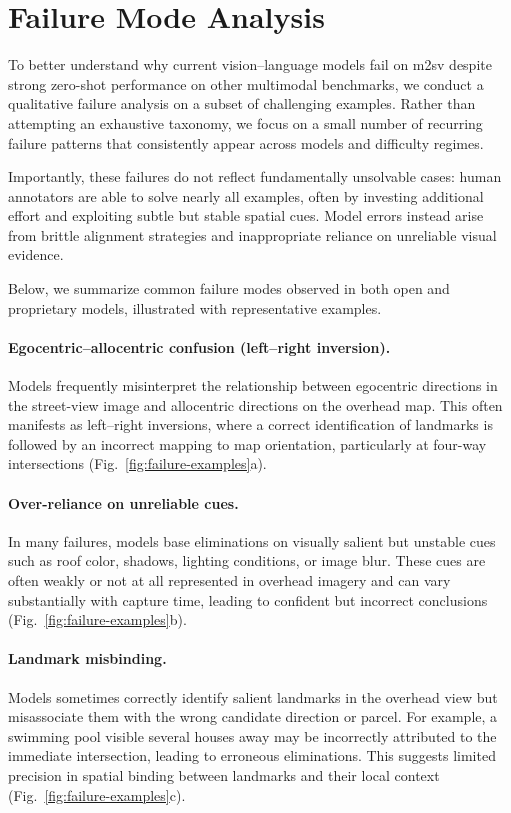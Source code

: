 \documentclass{article}
\begin{document}
\section{Failure Mode Analysis}
\label{sec:failure-analysis}

To better understand why current vision--language models fail on m2sv despite
strong zero-shot performance on other multimodal benchmarks, we conduct a
qualitative failure analysis on a subset of challenging examples. Rather than
attempting an exhaustive taxonomy, we focus on a small number of recurring
failure patterns that consistently appear across models and difficulty regimes.

Importantly, these failures do not reflect fundamentally unsolvable cases: human
annotators are able to solve nearly all examples, often by investing additional
effort and exploiting subtle but stable spatial cues. Model errors instead arise
from brittle alignment strategies and inappropriate reliance on unreliable visual
evidence.

Below, we summarize common failure modes observed in both open and
proprietary models, illustrated with representative examples.


\paragraph{Egocentric--allocentric confusion (left--right inversion).}
Models frequently misinterpret the relationship between egocentric directions in
the street-view image and allocentric directions on the overhead map. This often
manifests as left--right inversions, where a correct identification of landmarks
is followed by an incorrect mapping to map orientation, particularly at
four-way intersections (Fig.~\ref{fig:failure-examples}a).

\paragraph{Over-reliance on unreliable cues.}
In many failures, models base eliminations on visually salient but unstable cues
such as roof color, shadows, lighting conditions, or image blur. These cues are
often weakly or not at all represented in overhead imagery and can vary
substantially with capture time, leading to confident but incorrect conclusions
(Fig.~\ref{fig:failure-examples}b).

\paragraph{Landmark misbinding.}
Models sometimes correctly identify salient landmarks in the overhead view but
misassociate them with the wrong candidate direction or parcel. For example, a
swimming pool visible several houses away may be incorrectly attributed to the
immediate intersection, leading to erroneous eliminations. This suggests limited
precision in spatial binding between landmarks and their local context
(Fig.~\ref{fig:failure-examples}c).
\end{document}
